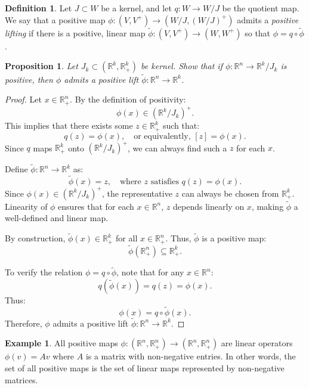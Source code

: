 \documentclass[11pt]{amsart}
\newtheorem{prop}[thm]{Proposition}
\theoremstyle{definition}
\newtheorem{defn}[thm]{Definition}
\newtheorem{example}[thm]{Example}
\def\bb{\mathbb}
\begin{document}
\begin{defn}
    Let $J\subset W$ be a kernel, and let $q: W\to W/J$ be the quotient map. We say that a positive map $\phi: (V,V^+)\to (W/J, (W/J)^+)$ admits a \emph{positive lifting} if there is a positive, linear map $\tilde\phi: (V,V^+)\to (W,W^+)$ so that $\phi = q\circ \tilde\phi$.
\end{defn}

\begin{prop}\label{ex:rn-lift}
    Let $J_k\subset (\mathbb R^k, \mathbb R_+^k)$ be kernel. Show that if $\phi: \mathbb R^n\to \mathbb R^k/J_k$ is positive, then $\phi$ admits a positive lift $\tilde\phi: \mathbb R^n\to \mathbb R^k$.
\end{prop}

\begin{proof}
    Let \( x \in \mathbb{R}_+^n \). By the definition of positivity:
    \[
    \phi(x) \in (\mathbb{R}^k / J_k)^+.
    \]
    This implies that there exists some \( z \in \mathbb{R}_+^k \) such that:
    \[
    q(z) = \phi(x), \quad \text{or equivalently, } [z] = \phi(x).
    \]
    Since \( q \) maps \( \mathbb{R}_+^k \) onto \( (\mathbb{R}^k / J_k)^+ \), we can always find such a \( z \) for each \( x \).

    Define \( \tilde{\phi}: \mathbb{R}^n \to \mathbb{R}^k \) as:
    \[
    \tilde{\phi}(x) = z, \quad \text{where } z \text{ satisfies } q(z) = \phi(x).
    \]
    Since \( \phi(x) \in (\mathbb{R}^k / J_k)^+ \), the representative \( z \) can always be chosen from \( \mathbb{R}_+^k \). Linearity of \( \phi \) ensures that for each \( x \in \mathbb{R}^n \), \( z \) depends linearly on \( x \), making \( \tilde{\phi} \) a well-defined and linear map.

    By construction, \( \tilde{\phi}(x) \in \mathbb{R}_+^k \) for all \( x \in \mathbb{R}_+^n \). Thus, \( \tilde{\phi} \) is a positive map:
    \[
    \tilde{\phi}(\mathbb{R}_+^n) \subseteq \mathbb{R}_+^k.
    \]

    To verify the relation \( \phi = q \circ \tilde{\phi} \), note that for any \( x \in \mathbb{R}^n \):
    \[
    q(\tilde{\phi}(x)) = q(z) = \phi(x).
    \]
    Thus:
    \[
    \phi(x) = q \circ \tilde{\phi}(x).
    \]
    Therefore, \( \phi \) admits a positive lift \( \tilde{\phi}: \mathbb{R}^n \to \mathbb{R}^k \).
\end{proof}

\begin{example}
    All positive maps $\phi: (\bb R^n, \bb R_+^n)\to (\bb R^n,\bb R_+^n)$ are linear operators \(\phi(v) = Av\) where \(A\) is a matrix with non-negative entries. In other words, the set of all positive maps is the set of linear maps represented by non-negative matrices.
\end{example}
\end{document}
